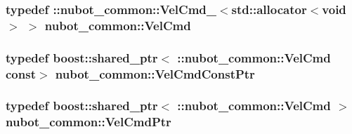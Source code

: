 \hypertarget{namespacenubot__common_acc00f78d81bb67c28f6b4aaf38c2c884}{
\subsubsection[{Vel\-Cmd}]{\setlength{\rightskip}{0pt plus 5cm}typedef \-::{\bf nubot\-\_\-common\-::\-Vel\-Cmd\-\_\-}$<$std\-::allocator$<$void$>$ $>$ {\bf nubot\-\_\-common\-::\-Vel\-Cmd}}}\label{namespacenubot__common_acc00f78d81bb67c28f6b4aaf38c2c884}
\hypertarget{namespacenubot__common_a432df2503deef33e00a5aa25b43c3d05}{
\subsubsection[{Vel\-Cmd\-Const\-Ptr}]{\setlength{\rightskip}{0pt plus 5cm}typedef boost\-::shared\-\_\-ptr$<$ \-::{\bf nubot\-\_\-common\-::\-Vel\-Cmd} const$>$ {\bf nubot\-\_\-common\-::\-Vel\-Cmd\-Const\-Ptr}}}\label{namespacenubot__common_a432df2503deef33e00a5aa25b43c3d05}
\hypertarget{namespacenubot__common_a1bad07d199495dad168c627253bbf1ec}{
\subsubsection[{Vel\-Cmd\-Ptr}]{\setlength{\rightskip}{0pt plus 5cm}typedef boost\-::shared\-\_\-ptr$<$ \-::{\bf nubot\-\_\-common\-::\-Vel\-Cmd} $>$ {\bf nubot\-\_\-common\-::\-Vel\-Cmd\-Ptr}}}\label{namespacenubot__common_a1bad07d199495dad168c627253bbf1ec}


